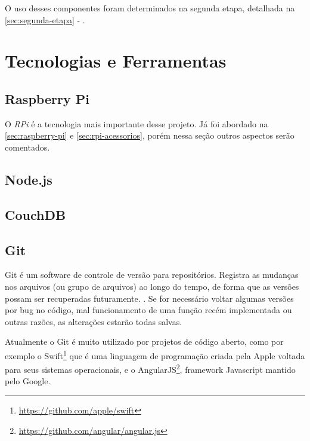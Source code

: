 \documentclass[
		12pt,				%
		openright,			%
		oneside,			%
		a4paper,			%
		chapter=TITLE,		%
		english,			%
		brazil				%
	]{abntex2}
\begin{document}
O uso desses componentes foram determinados na segunda etapa, detalhada na \autoref{sec:segunda-etapa} - .


\section{Tecnologias e Ferramentas}\label{sec:tecnologias-ferramentas}


\subsection{Raspberry Pi}\label{sec:rpi-tecnologia}

O \textit{RPi} é a tecnologia mais importante desse projeto. Já foi abordado na \autoref{sec:raspberry-pi} e \autoref{sec:rpi-acessorios}, porém nessa seção outros aspectos serão comentados.



\subsection{Node.js}\label{sec:node-js}


\subsection{CouchDB}\label{sec:couchdb}



\subsection{Git}\label{sec:git}

Git é um software de controle de versão para repositórios. Registra as mudanças nos arquivos (ou grupo de arquivos) ao longo do tempo, de forma que as versões possam ser recuperadas futuramente. \cite{pro-git}. Se for necessário voltar algumas versões por bug no código, mal funcionamento de uma função recém implementada ou outras razões, as alterações estarão todas salvas.

Atualmente o Git é muito utilizado por projetos de código aberto, como por exemplo o Swift\footnote{\url{https://github.com/apple/swift}} que é uma linguagem de programação criada pela Apple voltada para seus sistemas operacionais, e o AngularJS\footnote{\url{https://github.com/angular/angular.js}}, framework Javascript mantido pelo Google.
\end{document}
